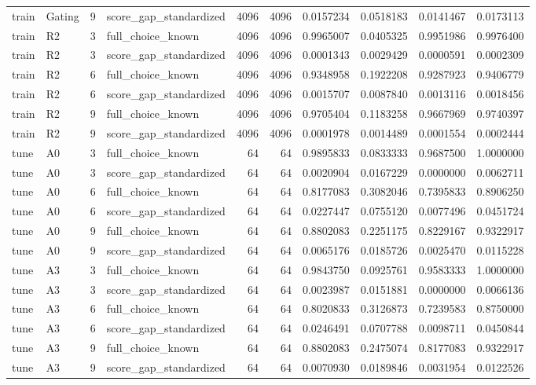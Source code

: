 \begin{tabular}{llrlrrrrrr}
train & Gating & 9 & score_gap_standardized & 4096 & 4096 & 0.0157234 & 0.0518183 & 0.0141467 & 0.0173113 \\
train & R2 & 3 & full_choice_known & 4096 & 4096 & 0.9965007 & 0.0405325 & 0.9951986 & 0.9976400 \\
train & R2 & 3 & score_gap_standardized & 4096 & 4096 & 0.0001343 & 0.0029429 & 0.0000591 & 0.0002309 \\
train & R2 & 6 & full_choice_known & 4096 & 4096 & 0.9348958 & 0.1922208 & 0.9287923 & 0.9406779 \\
train & R2 & 6 & score_gap_standardized & 4096 & 4096 & 0.0015707 & 0.0087840 & 0.0013116 & 0.0018456 \\
train & R2 & 9 & full_choice_known & 4096 & 4096 & 0.9705404 & 0.1183258 & 0.9667969 & 0.9740397 \\
train & R2 & 9 & score_gap_standardized & 4096 & 4096 & 0.0001978 & 0.0014489 & 0.0001554 & 0.0002444 \\
tune & A0 & 3 & full_choice_known & 64 & 64 & 0.9895833 & 0.0833333 & 0.9687500 & 1.0000000 \\
tune & A0 & 3 & score_gap_standardized & 64 & 64 & 0.0020904 & 0.0167229 & 0.0000000 & 0.0062711 \\
tune & A0 & 6 & full_choice_known & 64 & 64 & 0.8177083 & 0.3082046 & 0.7395833 & 0.8906250 \\
tune & A0 & 6 & score_gap_standardized & 64 & 64 & 0.0227447 & 0.0755120 & 0.0077496 & 0.0451724 \\
tune & A0 & 9 & full_choice_known & 64 & 64 & 0.8802083 & 0.2251175 & 0.8229167 & 0.9322917 \\
tune & A0 & 9 & score_gap_standardized & 64 & 64 & 0.0065176 & 0.0185726 & 0.0025470 & 0.0115228 \\
tune & A3 & 3 & full_choice_known & 64 & 64 & 0.9843750 & 0.0925761 & 0.9583333 & 1.0000000 \\
tune & A3 & 3 & score_gap_standardized & 64 & 64 & 0.0023987 & 0.0151881 & 0.0000000 & 0.0066136 \\
tune & A3 & 6 & full_choice_known & 64 & 64 & 0.8020833 & 0.3126873 & 0.7239583 & 0.8750000 \\
tune & A3 & 6 & score_gap_standardized & 64 & 64 & 0.0246491 & 0.0707788 & 0.0098711 & 0.0450844 \\
tune & A3 & 9 & full_choice_known & 64 & 64 & 0.8802083 & 0.2475074 & 0.8177083 & 0.9322917 \\
tune & A3 & 9 & score_gap_standardized & 64 & 64 & 0.0070930 & 0.0189846 & 0.0031954 & 0.0122526 \\

\end{tabular}

